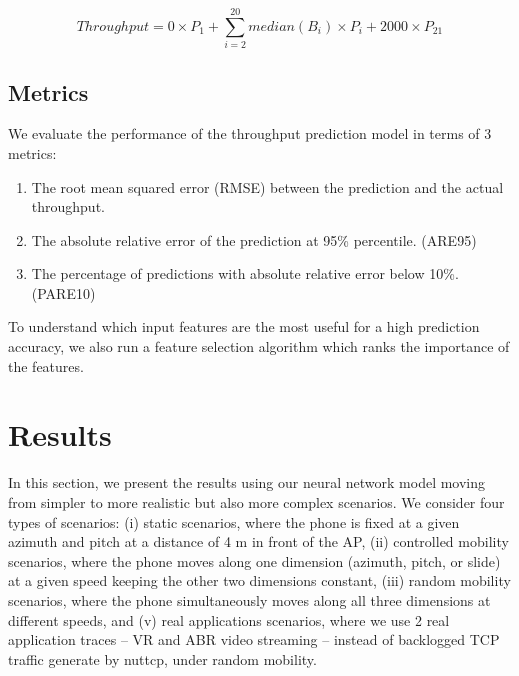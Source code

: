 \documentclass[sigconf,anonymous]{acmart}
\begin{document}
\begin{equation}
Throughput = 0 \times P_{1} + \sum_{i=2}^{20} median(B_{i}) \times P_{i} + 2000 \times P_{21}
\end{equation}


\subsection{Metrics}
We evaluate the performance of the throughput prediction model in terms of 3 metrics:

\begin{enumerate}
    \item The root mean squared error (RMSE) between the prediction and the actual throughput.
    \item The absolute relative error of the prediction at 95\% percentile. (ARE95)
    \item The percentage of predictions with absolute relative error below 10\%. (PARE10)
\end{enumerate}

To understand which input features are the most useful for a high prediction accuracy, we also run a feature selection algorithm which ranks the importance of the features.

\section{Results} %
\label{section: Results}

In this section, we present the results using our neural network model moving from simpler to more realistic but also more complex scenarios. We consider four types of scenarios: (i) static scenarios, where the phone is fixed at a given azimuth and pitch at a distance of 4 m in front of the AP, (ii) controlled mobility scenarios, where the phone moves along one dimension (azimuth, pitch, or slide) at a given speed keeping the other two dimensions constant, (iii) random mobility scenarios, where the phone simultaneously moves along all three dimensions at different speeds, and (v) real applications scenarios, where we use 2 real application traces -- VR and ABR video streaming -- instead of backlogged TCP traffic generate by nuttcp, under random mobility. 
\end{document}
